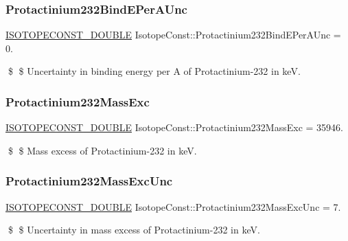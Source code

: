 \subsubsection{\texorpdfstring{Protactinium232\+Bind\+E\+Per\+A\+Unc}{Protactinium232BindEPerAUnc}}
{\footnotesize\ttfamily \mbox{\hyperlink{group___isotope_const-_macros_ga8f45a7272ce02c0b4c65c44636ed719a}{I\+S\+O\+T\+O\+P\+E\+C\+O\+N\+S\+T\+\_\+\+D\+O\+U\+B\+LE}} Isotope\+Const\+::\+Protactinium232\+Bind\+E\+Per\+A\+Unc = 0.}

\$ \$ Uncertainty in binding energy per A of Protactinium-\/232 in keV. \mbox{\label{group___isotope_const-_protactinium-_pa232_ga5234eb328524cf6ca99f849107350ef5}} 
\subsubsection{\texorpdfstring{Protactinium232\+Mass\+Exc}{Protactinium232MassExc}}
{\footnotesize\ttfamily \mbox{\hyperlink{group___isotope_const-_macros_ga8f45a7272ce02c0b4c65c44636ed719a}{I\+S\+O\+T\+O\+P\+E\+C\+O\+N\+S\+T\+\_\+\+D\+O\+U\+B\+LE}} Isotope\+Const\+::\+Protactinium232\+Mass\+Exc = 35946.}

\$ \$ Mass excess of Protactinium-\/232 in keV. \mbox{\label{group___isotope_const-_protactinium-_pa232_gacc47e4621bd5712ee0bf546e4707b8d9}} 
\subsubsection{\texorpdfstring{Protactinium232\+Mass\+Exc\+Unc}{Protactinium232MassExcUnc}}
{\footnotesize\ttfamily \mbox{\hyperlink{group___isotope_const-_macros_ga8f45a7272ce02c0b4c65c44636ed719a}{I\+S\+O\+T\+O\+P\+E\+C\+O\+N\+S\+T\+\_\+\+D\+O\+U\+B\+LE}} Isotope\+Const\+::\+Protactinium232\+Mass\+Exc\+Unc = 7.}

\$ \$ Uncertainty in mass excess of Protactinium-\/232 in keV. \mbox{\label{group___isotope_const-_protactinium-_pa232_ga64bdae1ac078d42433b11cfbb1844413}} 
